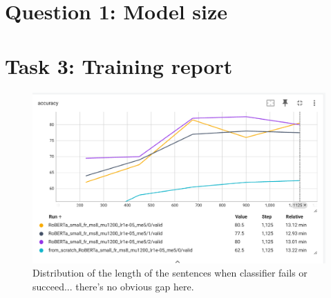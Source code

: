 \documentclass[a4paper]{article}
\begin{document}


\section{Question 1: Model size}


\section{Task 3: Training report}


\begin{figure}[ht]
    \centering
    \includegraphics[width=.6\textwidth]{figures/training_roberta.png}
    \caption{Distribution of the length of the sentences when classifier fails or succeed... there's no obvious gap here.}
    \label{fig:length_distribution}
\end{figure}


\end{document}

